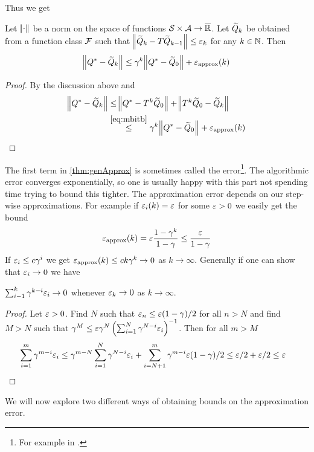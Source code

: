 Thus we get
\begin{thm}
  Let $\norm{\cdot}$ be a norm on the space of functions
  $\mathcal{S} \times \mathcal{A} \to \overline{\mathbb{R}}$.
  Let $\widetilde{Q}_k$ be obtained from a function class $\mathcal{F}$
  such that $\norm{\widetilde{Q}_{k} - T\widetilde{Q}_{k-1}} \leq \varepsilon_k$
  for any $k \in \mathbb{N}$. Then
  \[ \norm{Q^* - \widetilde{Q}_k} \leq \gamma^k \norm{Q^* - \widetilde{Q}_0}
  + \varepsilon_{\mathrm{approx}}(k) \]
  \label{thm:genApprox}
\end{thm}
\begin{proof}
  By the discussion above and
  \begin{align*}
    \norm{Q^* - \widetilde{Q}_k}
    &\leq \norm{Q^* - T^k \widetilde{Q}_0} + \norm{T^k \widetilde{Q}_0 - \widetilde{Q}_k}
    \\ &
    \stackrel{\ref{eq:mbitb}}{\leq}
    \gamma^k \norm{Q^* - \widetilde{Q}_0} + \varepsilon_{\mathrm{approx}}(k)
  \end{align*}
\end{proof}
The first term in \cref{thm:genApprox} is sometimes called the
 error\footnote{For example in .}.
The algorithmic error converges exponentially, so one is usually happy with this
part not spending time trying to bound this tighter.
The approximation error depends on our step-wise approximations. For example
if $\varepsilon_i(k) = \varepsilon$ for some $\varepsilon > 0$ we easily get the bound
\begin{equation}
  \varepsilon_{\mathrm{approx}}(k) = \varepsilon \frac{1-\gamma^k}{1-\gamma} \leq \frac{\varepsilon}{1-\gamma}
  \label{eq:approxEpsBound}
\end{equation}
If $\varepsilon_i \leq c\gamma^i$ we get $\varepsilon_{\mathrm{approx}}(k) \leq ck \gamma^k \to 0$ as
$k \to \infty$.
Generally if one can show that $\varepsilon_i \to 0$ we have
\begin{prop} $ \sum_{i-1}^k \gamma^{k-i} \varepsilon_i \to 0 $
  whenever $\varepsilon_k \to 0$ as $k \to \infty$.
\end{prop}
\begin{proof}
  Let $\varepsilon > 0$. Find $N$ such that $\varepsilon_n \leq \varepsilon (1-\gamma)/2$ 
  for all $n>N$ and find $M>N$ such that
  $\gamma^M \leq
  \varepsilon \gamma^N \left( \sum_{i=1}^N \gamma^{N-i} \varepsilon_i \right)^{-1}$.
  Then for all $m>M$
  \begin{align*}
    \sum_{i=1}^m \gamma^{m-i} \varepsilon_i
    &\leq \gamma^{m-N} \sum_{i=1}^N \gamma^{N-i} \varepsilon_i
    + \sum_{i=N+1}^m \gamma^{m-i} \varepsilon (1-\gamma)/2
    \leq \varepsilon/2 + \varepsilon/2 \leq \varepsilon
  \end{align*}
\end{proof}
We will now explore two different ways of obtaining bounds on the approximation 
error.

